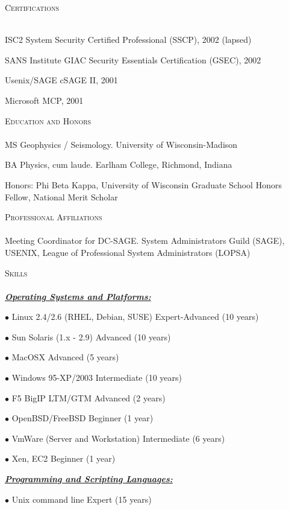 \documentclass{article}
\newcommand{\lineunder}{\vspace*{-8pt} \\ \hspace*{-18pt} \hrulefill \\}
\newcommand{\header}[1]{{\hspace*{-15pt}\vspace*{6pt} \textsc{#1}} \vspace*{-6pt} \lineunder}
\newcommand{\skillset}[1]{{ \underline{\textbf{\emph{#1}}}\\  }}
\newcommand{\skill}[2]{{$\bullet$ #1 \hfill #2 }}
\newenvironment{achievements}{\begin{list}{\topsep 0pt \itemsep -2pt}} {\vspace*{4pt}\end{list}}
\begin{document}
\header{Certifications}
\begin{achievements}
\item ISC2 System Security Certified Professional (SSCP), 2002 (lapsed)
\item SANS Institute GIAC Security Essentials Certification (GSEC), 2002
\item Usenix/SAGE cSAGE II, 2001
\item Microsoft MCP, 2001
\end{achievements}


\header{Education and Honors}

MS Geophysics / Seismology.  University of Wisconsin-Madison

BA Physics, cum laude. Earlham College, Richmond, Indiana

Honors: Phi Beta Kappa, University of Wisconsin Graduate School Honors Fellow, National Merit Scholar

\header{Professional Affiliations}
Meeting Coordinator for DC-SAGE.  
System Administrators Guild (SAGE), USENIX, League of Professional System Administrators (LOPSA) 


\header{Skills}

\skillset{Operating Systems and Platforms: }

\skill{Linux 2.4/2.6 (RHEL, Debian, SUSE)}{Expert-Advanced (10 years)}

\skill{Sun Solaris (1.x - 2.9)}{Advanced (10 years)}

\skill{MacOSX}{Advanced (5 years)}

\skill{Windows 95-XP/2003}{Intermediate (10 years)}

\skill{F5 BigIP LTM/GTM}{Advanced (2 years)}

\skill{OpenBSD/FreeBSD}{Beginner (1 year)}

\skill{VmWare (Server and Workstation)}{Intermediate (6 years)}

\skill{Xen, EC2}{Beginner (1 year)}



\skillset{Programming and Scripting Languages: }

\skill{Unix command line}{Expert (15 years)}
\end{document}
